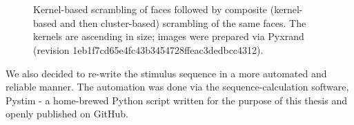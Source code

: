 	    \begin{figure}
    		\begin{subfigure}[b]{0.495\textwidth}
		    \centering{}
		    \label{fig:m.vs.pe.1.a}
		\end{subfigure}
		~%
		\begin{subfigure}[b]{0.495\textwidth}
		    \centering{}
		    \label{fig:m.vs.pe.1.b}
		\end{subfigure}
		
		\vspace{0.5cm}%
		\begin{subfigure}[b]{0.495\textwidth}
		    \centering{}
		    \label{fig:m.vs.pe.1.c}
		\end{subfigure}
		~%
		\begin{subfigure}[b]{0.495\textwidth}
		    \centering{}
		    \label{fig:m.vs.pe.1.d}
		\end{subfigure}
		\caption{Kernel-based scrambling of faces followed by composite (kernel-based and then cluster-based) scrambling of the same faces. 
		The kernels are ascending in size; images were prepared via Pyxrand\cite{pyxrand} (revision \textcolor{lg}{1eb1f7cd65e4fc43b3454728ffeac3dedbcc4312}).}
		\label{fig:animals}
	    \end{figure}

	    We also decided to re-write the stimulus sequence in a more automated and reliable manner.
	    The automation was done via the sequence-calculation software, Pystim\cite{pystim} - a home-brewed Python script written for the purpose of this thesis and openly published on GitHub.
	     
